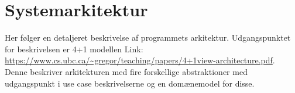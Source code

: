 \chapter{Systemarkitektur}
Her følger en detaljeret beskrivelse af programmets arkitektur. Udgangspunktet for beskrivelsen er 4+1 modellen Link: \url{https://www.cs.ubc.ca/~gregor/teaching/papers/4+1view-architecture.pdf}. Denne beskriver arkitekturen med fire forskellige abstraktioner med udgangspunkt i use case beskrivelserne og en domænemodel for disse.







